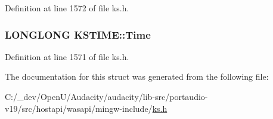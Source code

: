 Definition at line 1572 of file ks.\+h.

\subsubsection[{\texorpdfstring{Time}{Time}}]{\setlength{\rightskip}{0pt plus 5cm}L\+O\+N\+G\+L\+O\+NG K\+S\+T\+I\+M\+E\+::\+Time}\hypertarget{struct_k_s_t_i_m_e_a93eaad26488e9e8ab3e5093f9caac839}{}\label{struct_k_s_t_i_m_e_a93eaad26488e9e8ab3e5093f9caac839}


Definition at line 1571 of file ks.\+h.



The documentation for this struct was generated from the following file\+:\begin{DoxyCompactItemize}
\item 
C\+:/\+\_\+dev/\+Open\+U/\+Audacity/audacity/lib-\/src/portaudio-\/v19/src/hostapi/wasapi/mingw-\/include/\hyperlink{ks_8h}{ks.\+h}\end{DoxyCompactItemize}
